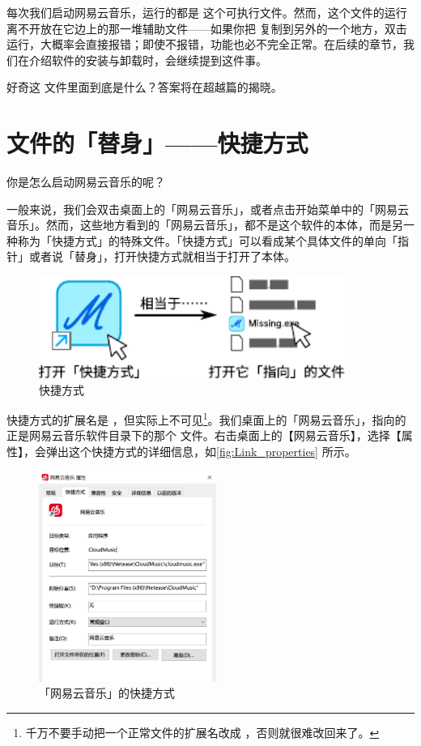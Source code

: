 {{每次我们启动网易云音乐，运行的都是  这个可执行文件。然而，这个文件的运行离不开放在它边上的那一堆辅助文件——如果你把  复制到另外的一个地方，双击运行，大概率会直接报错；即使不报错，功能也必不完全正常。在后续的章节，我们在介绍软件的安装与卸载时，会继续提到这件事。

\begin{note}
  好奇这  文件里面到底是什么？答案将在超越篇的揭晓。
\end{note}

\section{文件的「替身」——快捷方式}

你是怎么启动网易云音乐的呢？

一般来说，我们会双击桌面上的「网易云音乐」，或者点击开始菜单中的「网易云音乐」。然而，这些地方看到的「网易云音乐」，都不是这个软件的本体，而是另一种称为「快捷方式」的特殊文件。「快捷方式」可以看成某个具体文件的单向「指针」或者说「替身」，打开快捷方式就相当于打开了本体。

\begin{figure}[htb!]
  \centering
  \includegraphics[width=10cm]{assets/basic/Link.pdf}
  \caption{快捷方式}
  \label{fig:Link}
\end{figure}

快捷方式的扩展名是 ，但实际上不可见\cprotect\footnote{千万不要手动把一个正常文件的扩展名改成 ，否则就很难改回来了。}。我们桌面上的「网易云音乐」，指向的正是网易云音乐软件目录下的那个  文件。右击桌面上的【网易云音乐】，选择【属性】，会弹出这个快捷方式的详细信息，如\autoref{fig:Link_properties} 所示。

\begin{figure}
  \centering
  \includegraphics[width=5.8cm]{assets/basic/Link_properties.png}
  \caption{「网易云音乐」的快捷方式}
  \label{fig:Link_properties}
\end{figure}

}}

